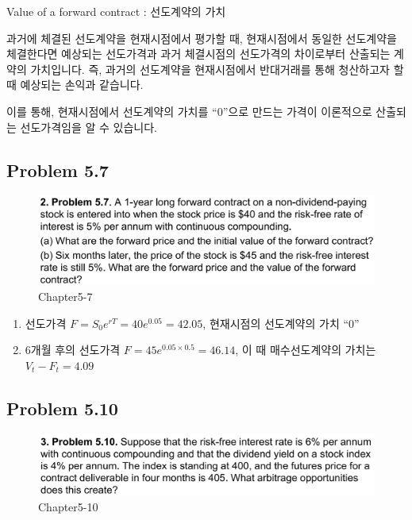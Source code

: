\documentclass[
  letterpaper,
  DIV=11,
  numbers=noendperiod]{scrreprt}
\begin{document}
Value of a forward contract : 선도계약의 가치

과거에 체결된 선도계약을 현재시점에서 평가할 때, 현재시점에서 동일한
선도계약을 체결한다면 예상되는 선도가격과 과거 체결시점의 선도가격의
차이로부터 산출되는 계약의 가치입니다. 즉, 과거의 선도계약을
현재시점에서 반대거래를 통해 청산하고자 할 때 예상되는 손익과 같습니다.

이를 통해, 현재시점에서 선도계약의 가치를 ``0''으로 만드는 가격이
이론적으로 산출되는 선도가격임을 알 수 있습니다.

\subsection*{\texorpdfstring{\textbf{Problem
5.7}}{Problem 5.7}}\label{problem-5.7}

\begin{figure}[H]

{\centering \includegraphics{images/선물옵션_5-7.png}

}

\caption{Chapter5-7}

\end{figure}%

\begin{enumerate}
\def\labelenumi{(\alph{enumi})}
\item
  선도가격 \(F=S_0e^{rT}=40e^{0.05}=42.05\), 현재시점의 선도계약의 가치
  ``0''
\item
  6개월 후의 선도가격 \(F=45e^{0.05\times 0.5}=46.14\), 이 때
  매수선도계약의 가치는 \(V_t-F_t=4.09\)
\end{enumerate}

\subsection*{\texorpdfstring{\textbf{Problem
5.10}}{Problem 5.10}}\label{problem-5.10}

\begin{figure}[H]

{\centering \includegraphics{images/선물옵션_5-10.png}

}

\caption{Chapter5-10}

\end{figure}%
\end{document}
